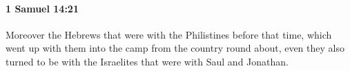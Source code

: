 
		\paragraph{1 Samuel 14:21} %
			\label{1SAMUEL-14-21}

			Moreover the Hebrews that were with the Philistines before that time, which went up with them into the camp from the country round about, even they also turned to be with the Israelites that were with Saul and Jonathan.


